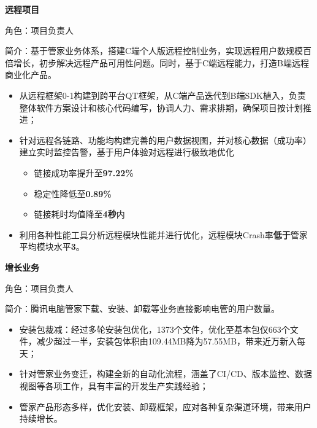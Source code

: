 \documentclass{resume}
\begin{document}
{\textbf{\large{远程项目}}}
\vspace{0.5ex}
\par{角色：项目负责人}
\par{简介：基于管家业务体系，搭建C端个人版远程控制业务，实现远程用户数规模百倍增长，初步解决远程产品可用性问题。同时，基于C端远程能力，打造B端远程商业化产品。}
\begin{itemize}[itemsep=0.4em]
  \item 从远程框架0-1构建到跨平台QT框架，从C端产品迭代到B端SDK植入，负责整体软件方案设计和核心代码编写，协调人力、需求排期，确保项目按计划推进；
  \item 针对远程各链路、功能均构建完善的用户数据视图，并对核心数据（成功率）建立实时监控告警，基于用户体验对远程进行极致地优化
	\begin{itemize}
	\item 链接成功率提升至\textbf{97.22\%}
	\item 稳定性降低至\textbf{0.89\%}
	\item 链接耗时均值降至\textbf{4秒}内
	\end{itemize}
  \item 利用各种性能工具分析远程模块性能并进行优化，远程模块Crash率\textbf{低于}管家平均模块水平\textbf{3\textperthousand}。
\end{itemize}

\vspace{2.0ex}
{\textbf{\large{增长业务}}}
\vspace{0.5ex}
\par{角色：项目负责人}
\par{简介：腾讯电脑管家下载、安装、卸载等业务直接影响电管的用户数量。}
\begin{itemize}[itemsep=0.4em]
  \item 安装包裁减：经过多轮安装包优化，1373个文件，优化至基本包仅663个文件，减少超过一半，安装包体积由109.44MB降为57.55MB，带来近万新入每天；
  \item 针对管家业务变迁，构建全新的自动化流程，涵盖了CI/CD、版本监控、数据视图等各项工作，具有丰富的开发生产实践经验；
  \item 管家产品形态多样，优化安装、卸载框架，应对各种复杂渠道环境，带来用户持续增长。
\end{itemize}

\end{document}
